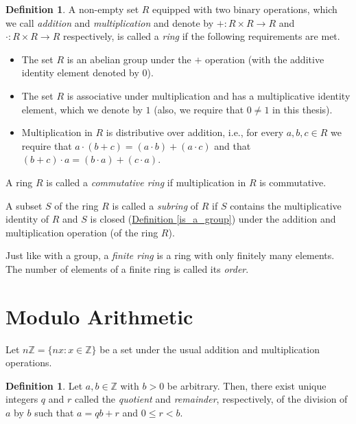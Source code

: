 \documentclass[openany, a4paper, 10pt]{book}
\theoremstyle{plain}
\theoremstyle{plain}
\theoremstyle{plain}
\theoremstyle{definition}
\newtheorem{definition}[theorem]{Definition}
\theoremstyle{plain}
\theoremstyle{definition}
\theoremstyle{remark}
\newcommand{\defref}[1]{\hyperref[#1]{Definition \ref{#1}}}
\begin{document}
\begin{definition}\label{is_a_ring}
    A non-empty set $R$ equipped with two binary operations, which we call \textit{addition} and \textit{multiplication} and denote by $+: R\times R \to R$ and $\cdot: R\times R \to R$ respectively, is called a \textit{ring} if the following requirements are met.
    \begin{itemize}
        \item The set $R$ is an abelian group under the $+$ operation (with the additive identity element denoted by $0$).
        \item The set $R$ is associative under multiplication and has a multiplicative identity element, which we denote by $1$ (also, we require that $0 \neq 1$ in this thesis).
        \item Multiplication in $R$ is distributive over addition, i.e., for every $a,b,c \in R$ we require that $a \cdot (b + c) = (a \cdot b) + (a \cdot c)$ and that $(b+c) \cdot a = (b\cdot a) + (c \cdot a)$.
    \end{itemize}
    A ring $R$ is called a \textit{commutative ring} if multiplication in $R$ is commutative.

    A subset $S$ of the ring $R$ is called a \textit{subring} of $R$ if $S$ contains the multiplicative identity of $R$ and $S$ is closed (\defref{is_a_group}) under the addition and multiplication operation (of the ring $R$).

    Just like with a group, a \textit{finite ring} is a ring with only finitely many elements. The number of elements of a finite ring is called its \textit{order}.
\end{definition}

\section{Modulo Arithmetic}
Let $n\mathbb Z = \{ nx: x \in \mathbb Z\}$ be a set under the usual addition and multiplication operations.

\begin{definition}
    Let $a,b \in \mathbb Z$ with $b > 0$ be arbitrary.
    Then, there exist unique \cite[Theorem~1.3]{dictaat_dion} integers $q$ and $r$ called the \textit{quotient} and \textit{remainder}, respectively, of the division of $a$ by $b$ such that $a=qb+r$ and $0 \leq r < b$.
\end{definition}
\end{document}
